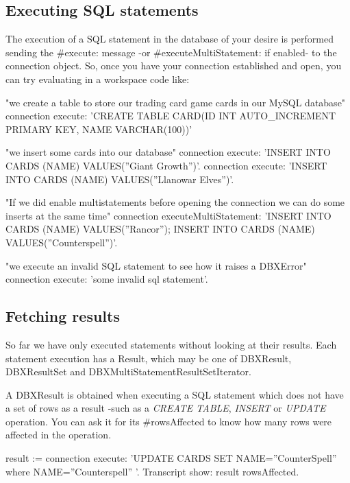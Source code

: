 \documentclass[a4paper,10pt,twoside]{book}
\begin{document}
\subsection{Executing SQL statements}

The execution of a SQL statement in the database of your desire is performed sending the \#execute: message -or \#executeMultiStatement: if enabled- to the connection object.  So, once you have your connection established and open, you can try evaluating in a workspace code like:

\begin{code}{}
"we create a table to store our trading card game cards in our MySQL database"
connection execute: 'CREATE TABLE CARD(ID INT AUTO_INCREMENT PRIMARY KEY, NAME VARCHAR(100))'

"we insert some cards into our database"
connection execute: 'INSERT INTO CARDS (NAME) VALUES(''Giant Growth'')'.
connection execute: 'INSERT INTO CARDS (NAME) VALUES(''Llanowar Elves'')'.

"If we did enable multistatements before opening the connection we can do some inserts at the same time"
connection executeMultiStatement: 'INSERT INTO CARDS (NAME) VALUES(''Rancor'');
                                   INSERT INTO CARDS (NAME) VALUES(''Counterspell'')'.

"we execute an invalid SQL statement to see how it raises a DBXError"
connection execute: 'some invalid sql statement'.
\end{code}

\subsection{Fetching results}
So far we have only executed statements without looking at their results.  Each statement execution has a Result, which may be one of DBXResult, DBXResultSet and DBXMultiStatementResultSetIterator.

A DBXResult is obtained when executing a SQL statement which does not have a set of rows as a result -such as a \emph{CREATE TABLE}, \emph{INSERT} or \emph{UPDATE} operation.  You can ask it for its \#rowsAffected to know how many rows were affected in the operation.

\begin{code}{}
result := connection execute: 'UPDATE CARDS SET NAME=''CounterSpell'' where NAME=''Counterspell'' '.
Transcript show: result rowsAffected.
\end{code}
\end{document}
